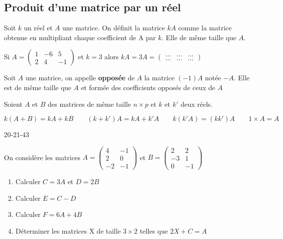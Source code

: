 \documentclass[a4paper]{article}
\begin{document}
\subsection{Produit d'une matrice par un réel}

\begin{definition}{}{}
	Soit $k$ un réel et $A$ une matrice. On définit la matrice $kA$ comme la matrice obtenue en multipliant chaque coefficient de A par $k$. Elle de même taille que $A$.
\end{definition}


\begin{example}{}{}
	Si $A=\begin{pmatrix}
1 & -6 & 5 \\
2 & 4 & -1 
\end{pmatrix}$ et $k = 3$ alors $kA=3A=\begin{pmatrix}
	\ldots & \ldots & \ldots \\
	\ldots & \ldots & \ldots 
\end{pmatrix}$

\end{example}

\begin{definition}{}{}
	Soit $A$ une matrice, on appelle \textbf{opposée} de $A$ la matrice $(-1)A$ notée $-A$. Elle est de même taille que $A$ et formée des coefficients opposés de ceux de $A$

\end{definition}
\begin{propriete}{}{}
	Soient $A$ et $B$ des matrices de même taille $n\times p$ et $k$ et $k'$ deux réels.

$$k(A+B)=kA+kB \qquad (k+k')A=kA+k'A \qquad k(k'A)=(kk')A \qquad  1 \times A = A $$
\end{propriete}


\begin{exercices}{}{}
	20-21-43
\end{exercices}

\begin{exercice}{}{}
On considère les matrices $A=\begin{pmatrix}
4&-1 \\
2&0 \\
-2 & -1 
\end{pmatrix}$ et $B=\begin{pmatrix}
2&2 \\
-3&1 \\
0 & -1 
\end{pmatrix}$
\begin{enumerate}
	\item Calculer $C=3A$ et $D=2B$
	\item Calculer $E=C-D$
	\item Calculer $F=6A+4B$
	\item Déterminer les matrices X de taille $3 \times 2$ telles que $2X+C=A$ 
\end{enumerate}
\end{exercice}
\end{document}
